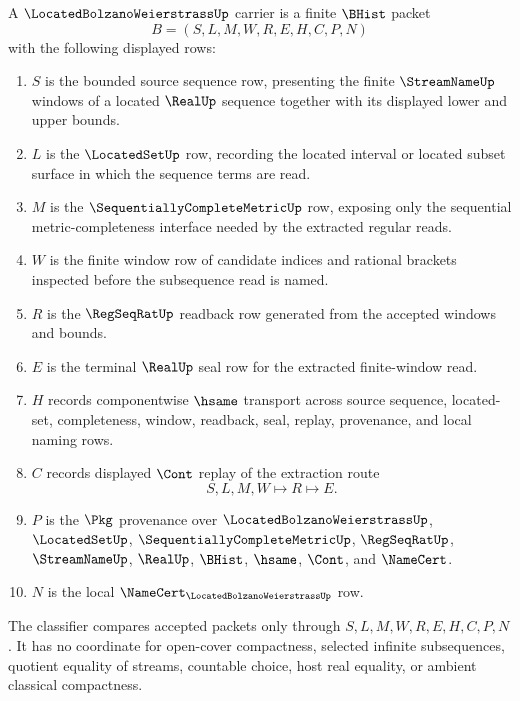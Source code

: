 \begin{definition}
\label{def:located-bolzano-weierstrass-carrier}
A $\LocatedBolzanoWeierstrassUp$ carrier is a finite $\BHist$ packet
$$
B=(S,L,M,W,R,E,H,C,P,N)
$$
with the following displayed rows:
\begin{enumerate}
\item $S$ is the bounded source sequence row, presenting the finite $\StreamNameUp$ windows of a located $\RealUp$ sequence together with its displayed lower and upper bounds.
\item $L$ is the $\LocatedSetUp$ row, recording the located interval or located subset surface in which the sequence terms are read.
\item $M$ is the $\SequentiallyCompleteMetricUp$ row, exposing only the sequential metric-completeness interface needed by the extracted regular reads.
\item $W$ is the finite window row of candidate indices and rational brackets inspected before the subsequence read is named.
\item $R$ is the $\RegSeqRatUp$ readback row generated from the accepted windows and bounds.
\item $E$ is the terminal $\RealUp$ seal row for the extracted finite-window read.
\item $H$ records componentwise $\hsame$ transport across source sequence, located-set, completeness, window, readback, seal, replay, provenance, and local naming rows.
\item $C$ records displayed $\Cont$ replay of the extraction route
$$
S,L,M,W \longmapsto R \longmapsto E .
$$
\item $P$ is the $\Pkg$ provenance over $\LocatedBolzanoWeierstrassUp$, $\LocatedSetUp$, $\SequentiallyCompleteMetricUp$, $\RegSeqRatUp$, $\StreamNameUp$, $\RealUp$, $\BHist$, $\hsame$, $\Cont$, and $\NameCert$.
\item $N$ is the local $\NameCert_{\LocatedBolzanoWeierstrassUp}$ row.
\end{enumerate}
The classifier compares accepted packets only through $S,L,M,W,R,E,H,C,P,N$. It has no coordinate for open-cover compactness, selected infinite subsequences, quotient equality of streams, countable choice, host real equality, or ambient classical compactness.
\end{definition}

